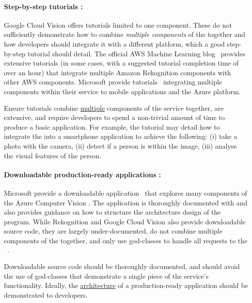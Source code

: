 \paragraph{Step-by-step tutorials :}  Google Cloud Vision offers tutorials limited to one component. These do not sufficiently demonstrate how to combine \textit{multiple components} of the  together and how developers should integrate it with a different platform, which a good step-by-step tutorial should detail. The official AWS Machine Learning blog~ provides extensive tutorials (in some cases, with a suggested tutorial completion time of over an hour) that integrate multiple Amazon Rekognition components with other AWS components. Microsoft provide tutorials~ integrating multiple components within their service to mobile applications and the Azure platform. 

\begin{leftbar}
\SuggestedImprovement
Ensure tutorials combine \uline{multiple} components of the service together, are extensive, and require developers to spend a non-trivial amount of time to produce a basic application. For example, the tutorial may detail how to integrate the  into a smartphone application to achieve the following: (i) take a photo with the camera, (ii) detect if a person is within the image, (iii) analyse the visual features of the person.
\end{leftbar}

\paragraph{Downloadable production-ready applications :} Microsoft provide a downloadable application~ that explores many components of the Azure Computer Vision . The application is thoroughly documented with and also provides guidance on how to structure the architecture design of the program. While Rekognition and Google Cloud Vision also provide downloadable source code, they are largely under-documented, do not combine multiple components of the  together, and only use god-classes to handle all requests to the ~.

\begin{leftbar}
\SuggestedImprovement
Downloadable source code should be thoroughly documented, and should avoid the use of god-classes that demonstrate a single piece of the service's functionality. Ideally, the \uline{architecture} of a production-ready application should be demonstrated to developers.
\end{leftbar}

